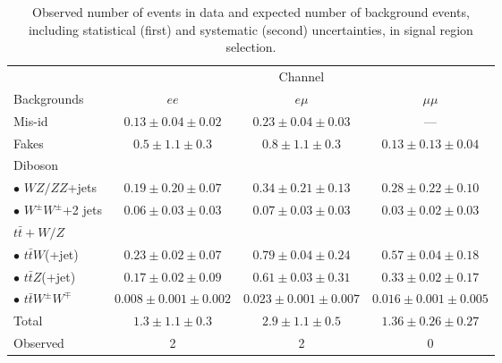 \begin{table}[t]
  \begin{center}
    \caption{Observed number of events in data and expected number of background events, including statistical (first) and systematic (second) uncertainties, in signal region selection.}\label{finalyield}
    \begin{tabular}{l|c|c|c}
      \hline\hline
       & \multicolumn{3}{c}{Channel} \\
      \cline{2-4}
      Backgrounds & $ee$ & $e\mu$ & $\mu\mu$ \\
      \hline
      Mis-id & $0.13\pm 0.04 \pm 0.02$ & $0.23\pm 0.04 \pm 0.03$ & --- \\
      Fakes & $0.5\pm 1.1 \pm 0.3$ & $0.8\pm 1.1 \pm 0.3$ & $0.13\pm 0.13\pm 0.04$ \\
      \hline
      Diboson & & & \\
      $\bullet$ $WZ/ZZ$+jets & $0.19\pm 0.20 \pm 0.07$ & $0.34\pm 0.21\pm 0.13$ & $0.28\pm 0.22\pm 0.10$ \\
      $\bullet$ $W^{\pm}W^\pm$+2 jets & $0.06\pm 0.03\pm 0.03$ & $0.07\pm 0.03\pm 0.03$ & $0.03\pm 0.02\pm 0.03$ \\
      \hline
      $t\bar{t}+W/Z$ & & & \\
      $\bullet$ $t\bar{t}W$(+jet) & $0.23\pm 0.02\pm 0.07$ & $0.79\pm 0.04\pm 0.24$ & $0.57\pm 0.04\pm 0.18$ \\
      $\bullet$ $t\bar{t}Z$(+jet) & $0.17\pm 0.02\pm 0.09$ & $0.61\pm 0.03\pm 0.31$ & $0.33\pm 0.02\pm 0.17$ \\
      $\bullet$ $t\bar{t}W^{\pm}W^\mp$ & $0.008\pm 0.001\pm 0.002$ & $0.023\pm 0.001\pm 0.007$ & $0.016\pm 0.001\pm 0.005$ \\
      \hline
      Total & $1.3 \pm 1.1 \pm 0.3$ & $2.9 \pm 1.1 \pm 0.5$ & $1.36 \pm 0.26 \pm 0.27$ \\
      \hline
      Observed & 2 & 2 & 0 \\
      \hline
    \end{tabular}
  \end{center}
\end{table}


